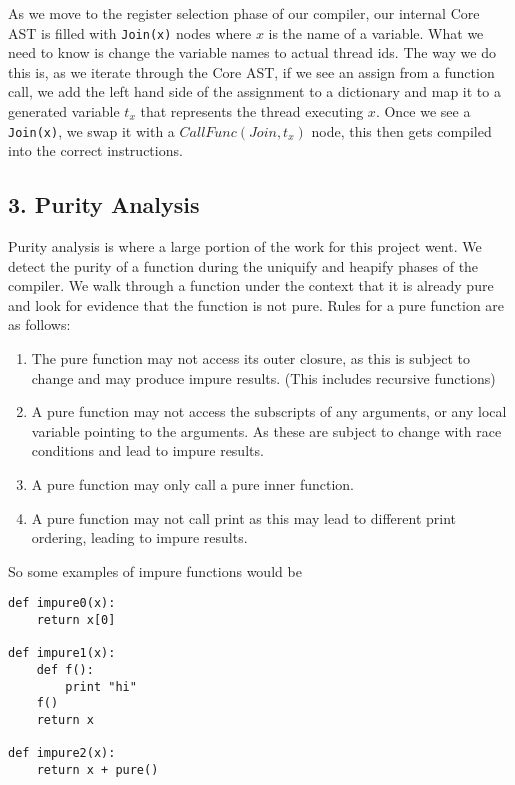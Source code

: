 \documentclass{acm_proc_article-sp}
\begin{document}
As we move to the register selection phase of our compiler, our internal Core
AST is filled with \verb|Join(x)| nodes where $x$ is the name of a variable.
What we need to know is change the variable names to actual thread ids. The way
we do this is, as we iterate through the Core AST, if we see an assign from a
function call, we add the left hand side of the assignment to a dictionary and
map it to a generated variable $t_x$ that represents the thread executing $x$.
Once we see a \verb|Join(x)|, we swap it with a $CallFunc(Join, t_x)$ node,
this then gets compiled into the correct instructions.


\subsection*{3. Purity Analysis}

Purity analysis is where a large portion of the work for this project went. We
detect the purity of a function during the uniquify and heapify phases of the
compiler. We walk through a function under the context that it is already pure
and look for evidence that the function is not pure. Rules for a pure function
are as follows:

\begin{enumerate} 

\item The pure function may not access its outer closure, as
this is subject to change and may produce impure results. (This includes
recursive functions) \item A pure function may not access the subscripts of any
arguments, or any local variable pointing to the arguments. As these are
subject to change with race conditions and lead to impure results.  \item A
pure function may only call a pure inner function.  \item A pure function may
not call print as this may lead to different print ordering, leading to impure
results.  \end{enumerate}

So some examples of impure functions would be 

\begin{verbatim}
def impure0(x):
    return x[0]

def impure1(x):
    def f():
        print "hi"
    f()
    return x

def impure2(x):
    return x + pure()
\end{verbatim}
\end{document}
